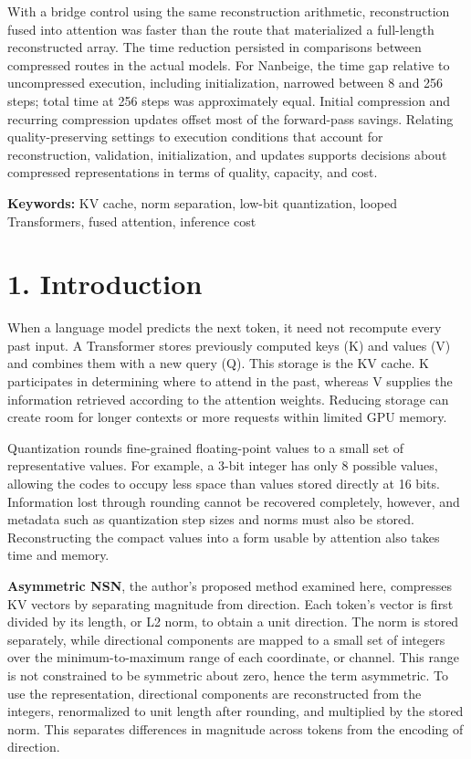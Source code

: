 \documentclass[10pt,a4paper]{article}
\newlength{\usable}
\begin{document}
With a bridge control using the same reconstruction arithmetic, reconstruction fused into attention was faster than the route that materialized a full-length reconstructed array. The time reduction persisted in comparisons between compressed routes in the actual models. For Nanbeige, the time gap relative to uncompressed execution, including initialization, narrowed between 8 and 256 steps; total time at 256 steps was approximately equal. Initial compression and recurring compression updates offset most of the forward-pass savings. Relating quality-preserving settings to execution conditions that account for reconstruction, validation, initialization, and updates supports decisions about compressed representations in terms of quality, capacity, and cost.

\textbf{Keywords:} KV cache, norm separation, low-bit quantization, looped Transformers, fused attention, inference cost

\clearpage

\section{1. Introduction}\label{introduction}

When a language model predicts the next token, it need not recompute every past input. A Transformer stores previously computed keys (K) and values (V) and combines them with a new query (Q). This storage is the KV cache. K participates in determining where to attend in the past, whereas V supplies the information retrieved according to the attention weights. Reducing storage can create room for longer contexts or more requests within limited GPU memory.

Quantization rounds fine-grained floating-point values to a small set of representative values. For example, a 3-bit integer has only 8 possible values, allowing the codes to occupy less space than values stored directly at 16 bits. Information lost through rounding cannot be recovered completely, however, and metadata such as quantization step sizes and norms must also be stored. Reconstructing the compact values into a form usable by attention also takes time and memory.

\textbf{Asymmetric NSN}, the author's proposed method examined here, compresses KV vectors by separating magnitude from direction. Each token's vector is first divided by its length, or L2 norm, to obtain a unit direction. The norm is stored separately, while directional components are mapped to a small set of integers over the minimum-to-maximum range of each coordinate, or channel. This range is not constrained to be symmetric about zero, hence the term asymmetric. To use the representation, directional components are reconstructed from the integers, renormalized to unit length after rounding, and multiplied by the stored norm. This separates differences in magnitude across tokens from the encoding of direction.
\end{document}

